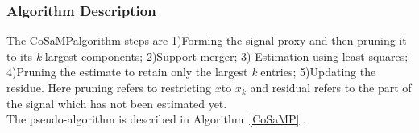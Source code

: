 \documentclass[12pt]{article}
\theoremstyle{definition}
\def\x{$x$\hspace{0.1in}}
\def\cosamp{CoSaMP\hspace{0.1in}}
\begin{document}
%   
%   
% 
% 

\subsubsection{Algorithm Description}
\label{Sec:cosamp_algo}
The \cosamp algorithm steps are 1)Forming the signal proxy and then pruning it to its \textit{k} largest
components; 2)Support merger; 3) Estimation using least squares; 4)Pruning the estimate to retain only the largest
\textit{k} entries; 5)Updating the residue. Here pruning refers to restricting \x to $x_k$ and residual
refers to the part of the signal which has not been estimated yet.\\
The pseudo-algorithm is described in Algorithm~\ref{CoSaMP} \cite{Needell-CoSaMP}.
\end{document}
